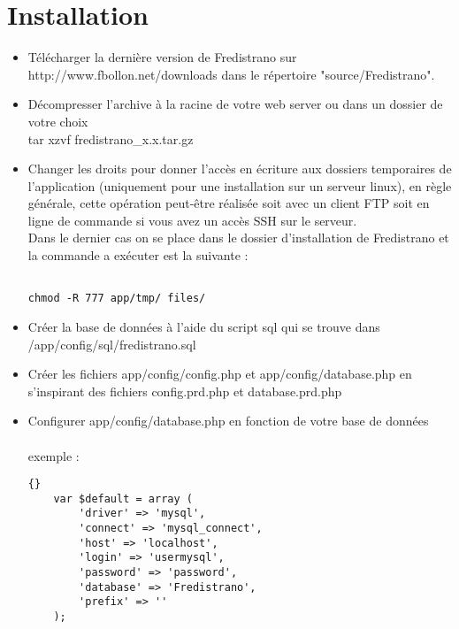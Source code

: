 \documentclass[12pt,a4paper]{report}
\begin{document}
\chapter{Installation}
\begin{itemize}
\item Télécharger la dernière version de Fredistrano sur http://www.fbollon.net/downloads dans le répertoire "source/Fredistrano".\\
\item Décompresser l'archive à la racine de votre web server ou dans un dossier de votre choix \: \\
tar xzvf fredistrano\_x.x.tar.gz \\
\item Changer les droits pour donner l'accès en écriture aux dossiers temporaires de l'application (uniquement pour une installation sur un serveur linux), en règle générale, cette opération peut-être réalisée soit avec un client FTP soit en ligne de commande si vous avez un accès SSH sur le serveur.\\
Dans le dernier cas on se place dans le dossier d'installation de Fredistrano et la commande a exécuter est la suivante :
\begin{verbatim}

chmod -R 777 app/tmp/ files/

\end{verbatim}

\item Créer la base de données à l'aide du script sql qui se trouve dans\\ /app/config/sql/fredistrano.sql\\
\item Créer les fichiers app/config/config.php et app/config/database.php en s'inspirant des fichiers config.prd.php et database.prd.php\newpage

\item Configurer app/config/database.php en fonction de votre base de données\\\\exemple :\\

\lstset{language=Php}
\lstset{commentstyle=\textit}

\begin{lstlisting}[frame=tb]{}
	var $default = array (
		'driver' => 'mysql',
		'connect' => 'mysql_connect',
		'host' => 'localhost',
		'login' => 'usermysql',
		'password' => 'password',
		'database' => 'Fredistrano',
		'prefix' => ''
	);
\end{lstlisting}



\end{itemize}
\end{document}
